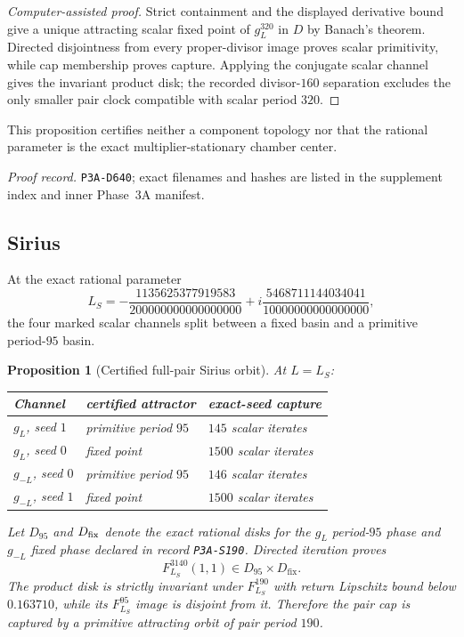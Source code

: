 \documentclass[11pt]{article}
\newtheorem{proposition}[theorem]{Proposition}
\theoremstyle{definition}
\theoremstyle{remark}
\begin{document}
\begin{proof}[Computer-assisted proof]
Strict containment and the displayed derivative bound give a unique attracting scalar fixed point of $g_L^{320}$ in $D$ by Banach's theorem.  Directed disjointness from every proper-divisor image proves scalar primitivity, while cap membership proves capture.  Applying the conjugate scalar channel gives the invariant product disk; the recorded divisor-$160$ separation excludes the only smaller pair clock compatible with scalar period $320$.
\end{proof}

This proposition certifies neither a component topology nor that the rational parameter is the exact multiplier-stationary chamber center.

\noindent\emph{Proof record.} \texttt{P3A-D640}; exact filenames and hashes are listed in the supplement index and inner Phase~3A manifest.

\subsection{Sirius}

At the exact rational parameter
\begin{equation}
  L_S=-\frac{1135625377919583}{200000000000000000}
      +i\frac{5468711144034041}{10000000000000000},
  \label{eq:sirius-parameter}
\end{equation}
the four marked scalar channels split between a fixed basin and a primitive period-$95$ basin.

\begin{proposition}[Certified full-pair Sirius orbit]\label{prop:sirius}
At $L=L_S$:
\begin{center}
\begin{tabular}{lll}
\toprule
Channel & certified attractor & exact-seed capture \\
\midrule
$g_L$, seed $1$ & primitive period $95$ & $145$ scalar iterates \\
$g_L$, seed $0$ & fixed point & $1500$ scalar iterates \\
$g_{-L}$, seed $0$ & primitive period $95$ & $146$ scalar iterates \\
$g_{-L}$, seed $1$ & fixed point & $1500$ scalar iterates \\
\bottomrule
\end{tabular}
\end{center}
Let $D_{95}$ and $D_{\rm fix}$ denote the exact rational disks for the $g_L$ period-$95$ phase and $g_{-L}$ fixed phase declared in record \texttt{P3A-S190}.  Directed iteration proves
\[
  F_{L_S}^{3140}(1,1)\in D_{95}\times D_{\mathrm{fix}}.
\]
The product disk is strictly invariant under $F_{L_S}^{190}$ with return Lipschitz bound below $0.163710$, while its $F_{L_S}^{95}$ image is disjoint from it.  Therefore the pair cap is captured by a primitive attracting orbit of pair period $190$.
\end{proposition}
\end{document}
